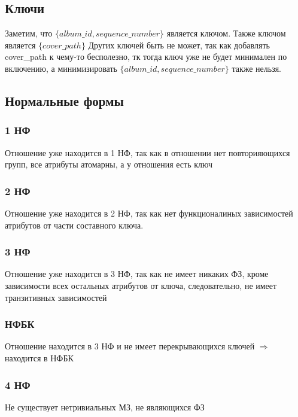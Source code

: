 \documentclass{article}
\begin{document}
\subsection{Ключи}

Заметим, что $\{album\_id, sequence\_number\}$ является ключом. Также ключом является $\{cover\_path\}$ Других ключей быть не может, так как  добавлять cover\_path к чему-то бесполезно, тк тогда ключ уже не будет минимален по включению, а минимизировать $\{album\_id, sequence\_number\}$ также нельзя.

\subsection{Нормальные формы}

\subsubsection{1 НФ}

Отношение уже находится в 1 НФ, так как в отношении нет повторияющихся групп, все атрибуты атомарны, а у отношения есть ключ

\subsubsection{2 НФ}

Отношение уже находится в 2 НФ, так как нет функционалиных зависимостей атрибутов от части составного ключа.

\subsubsection{3 НФ}

Отношение уже находится в 3 НФ, так как не имеет никаких ФЗ, кроме зависимости всех остальных атрибутов от ключа, следовательно, не имеет транзитивных зависимостей

\subsubsection{НФБК}

Отношение находится в 3 НФ и не имеет перекрывающихся ключей $\Rightarrow$ находится в НФБК

\subsubsection{4 НФ}

Не существует нетривиальных МЗ, не являющихся ФЗ
\end{document}
